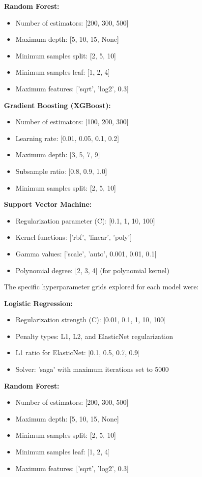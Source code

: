 \documentclass[conference]{IEEEtran}
\begin{document}
\textbf{Random Forest:}
\begin{itemize}
    \item Number of estimators: [200, 300, 500]
    \item Maximum depth: [5, 10, 15, None]
    \item Minimum samples split: [2, 5, 10]
    \item Minimum samples leaf: [1, 2, 4]
    \item Maximum features: ['sqrt', 'log2', 0.3]
\end{itemize}

\textbf{Gradient Boosting (XGBoost):}
\begin{itemize}
    \item Number of estimators: [100, 200, 300]
    \item Learning rate: [0.01, 0.05, 0.1, 0.2]
    \item Maximum depth: [3, 5, 7, 9]
    \item Subsample ratio: [0.8, 0.9, 1.0]
    \item Minimum samples split: [2, 5, 10]
\end{itemize}

\textbf{Support Vector Machine:}
\begin{itemize}
    \item Regularization parameter (C): [0.1, 1, 10, 100]
    \item Kernel functions: ['rbf', 'linear', 'poly']
    \item Gamma values: ['scale', 'auto', 0.001, 0.01, 0.1]
    \item Polynomial degree: [2, 3, 4] (for polynomial kernel)
\end{itemize}

The specific hyperparameter grids explored for each model were:

\textbf{Logistic Regression:}
\begin{itemize}
    \item Regularization strength (C): [0.01, 0.1, 1, 10, 100]
    \item Penalty types: L1, L2, and ElasticNet regularization
    \item L1 ratio for ElasticNet: [0.1, 0.5, 0.7, 0.9]
    \item Solver: 'saga' with maximum iterations set to 5000
\end{itemize}

\textbf{Random Forest:}
\begin{itemize}
    \item Number of estimators: [200, 300, 500]
    \item Maximum depth: [5, 10, 15, None]
    \item Minimum samples split: [2, 5, 10]
    \item Minimum samples leaf: [1, 2, 4]
    \item Maximum features: ['sqrt', 'log2', 0.3]
\end{itemize}
\end{document}
